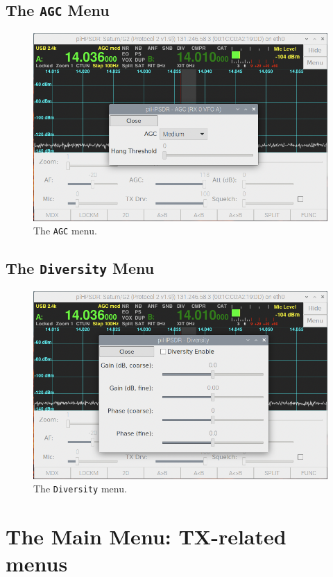 \documentclass[12pt]{book}
\def\bltt#1{\texttt{\color{blue}#1}}
\begin{document}
\section{The \texttt{AGC} Menu}
\begin{figure}[h]
\center
\includegraphics[width=12cm]{AGCMenu.png}
\caption{The \bltt{AGC} menu.}
\label{fig:AGCMenu}
\end{figure}

\section{The \texttt{Diversity} Menu}
\begin{figure}[h]
\center
\includegraphics[width=12cm]{DiversityMenu.png}
\caption{The \bltt{Diversity} menu.}
\label{fig:DiversityMenu}
\end{figure}

\chapter{The Main Menu: TX-related menus}
\end{document}
